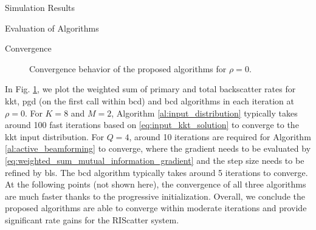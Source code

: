 \documentclass[journal]{IEEEtran}
\begin{document}
\begin{section}{Simulation Results}
\begin{subsection}{Evaluation of Algorithms}
		\begin{subsubsection}{Convergence}
			\begin{figure}[!t]
				\centering
				\resizebox{0.75\columnwidth}{!}{
					
				}
				\caption{Convergence behavior of the proposed algorithms for $\rho=0$.}
				\label{fi:wsr_convergence}
			\end{figure}

			In Fig. \ref{fi:wsr_convergence}, we plot the weighted sum of primary and total backscatter rates for \gls{kkt}, \gls{pgd} (on the first call within \gls{bcd}) and \gls{bcd} algorithms in each iteration at $\rho=0$.
			For $K=8$ and $M=2$, Algorithm \ref{al:input_distribution} typically takes around \num{100} fast iterations based on \eqref{eq:input_kkt_solution} to converge to the \gls{kkt} input distribution.
			For $Q=4$, around \num{10} iterations are required for Algorithm \ref{al:active_beamforming} to converge, where the gradient needs to be evaluated by \eqref{eq:weighted_sum_mutual_information_gradient} and the step size needs to be refined by \gls{bls}.
			The \gls{bcd} algorithm typically takes around \num{5} iterations to converge.
			At the following points (not shown here), the convergence of all three algorithms are much faster thanks to the progressive initialization.
			Overall, we conclude the proposed algorithms are able to converge within moderate iterations and provide significant rate gains for the RIScatter system.
		\end{subsubsection}
	\end{subsection}


\end{section}
\end{document}
